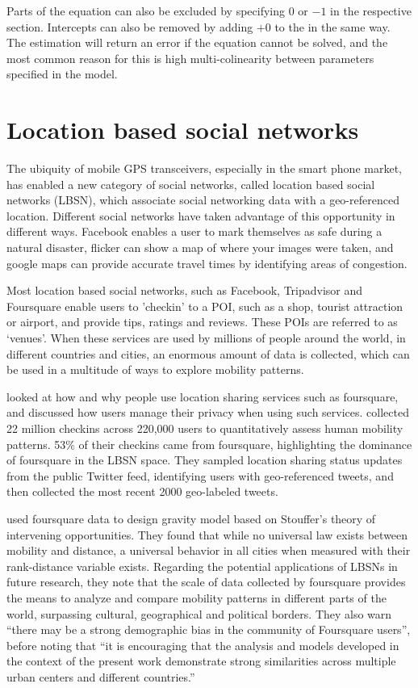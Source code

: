 Parts of the equation can also be excluded by specifying $0$ or $-1$ in the respective section. Intercepts can also be removed by adding $+ 0$ to the in the same way. The estimation will return an error if the equation cannot be solved, and the most common reason for this is high multi-colinearity between parameters specified in the model.

\section{Location based social networks}
The ubiquity of mobile GPS transceivers, especially in the smart phone market, has enabled a new category of social networks, called location based social networks (LBSN), which associate social networking data with a geo-referenced location. Different social networks have taken advantage of this opportunity in different ways. Facebook enables a user to mark themselves as safe during a natural disaster, flicker can show a map of where your images were taken, and google maps can provide accurate travel times by identifying areas of congestion. 

Most location based social networks, such as Facebook, Tripadvisor and Foursquare enable users to 'checkin' to a POI, such as a shop, tourist attraction or airport, and provide tips, ratings and reviews. These POIs are referred to as `venues'. When these services are used by millions of people around the world, in different countries and cities, an enormous amount of data is collected, which can be used in a multitude of ways to explore mobility patterns. 

\textcite{lindqvist2011m} looked at how and why people use location sharing services such as foursquare, and discussed how users manage their privacy when using such services. \autocite{cheng2011exploring} collected 22 million checkins across 220,000 users to quantitatively assess human mobility patterns. 53\% of their checkins came from foursquare, highlighting the dominance of foursquare in the LBSN space. They sampled location sharing status updates from the public Twitter feed, identifying users with geo-referenced tweets, and then collected the most recent 2000 geo-labeled tweets.

\textcite{noulas2012tale} used foursquare data to design gravity model based on Stouffer's theory of intervening opportunities\parencite{stouffer1940intervening}. They found that while no universal law exists between mobility and distance, a universal behavior in all cities when measured with their rank-distance variable exists. Regarding the potential applications of LBSNs in future research, they note that the scale of data collected by foursquare provides the means to analyze and compare mobility patterns in different parts of the world, surpassing cultural, geographical and political borders. They also warn \enquote{there may be a strong demographic bias in the community of Foursquare users}, before noting that \enquote{it is encouraging that the analysis and models developed in the context of the present work demonstrate strong similarities across multiple urban centers and different countries.}


